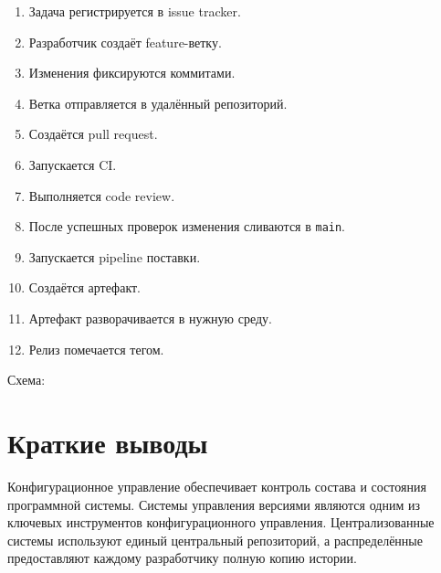 \documentclass[12pt,a4paper]{article}
\begin{document}
\begin{enumerate}
    \item Задача регистрируется в issue tracker.
    \item Разработчик создаёт feature-ветку.
    \item Изменения фиксируются коммитами.
    \item Ветка отправляется в удалённый репозиторий.
    \item Создаётся pull request.
    \item Запускается CI.
    \item Выполняется code review.
    \item После успешных проверок изменения сливаются в \texttt{main}.
    \item Запускается pipeline поставки.
    \item Создаётся артефакт.
    \item Артефакт разворачивается в нужную среду.
    \item Релиз помечается тегом.
\end{enumerate}

Схема:

\begin{center}
\end{center}

\section{Краткие выводы}

Конфигурационное управление обеспечивает контроль состава и состояния программной системы. Системы управления версиями являются одним из ключевых инструментов конфигурационного управления. Централизованные системы используют единый центральный репозиторий, а распределённые предоставляют каждому разработчику полную копию истории.
\end{document}
